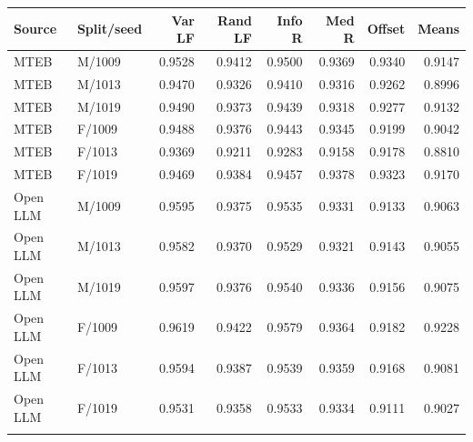 \begin{tabular}{llrrrrrr}\toprule Source & Split/seed & Var LF & Rand LF & Info R & Med R & Offset & Means \\ \midrule
MTEB & M/1009 & 0.9528 & 0.9412 & 0.9500 & 0.9369 & 0.9340 & 0.9147 \\
MTEB & M/1013 & 0.9470 & 0.9326 & 0.9410 & 0.9316 & 0.9262 & 0.8996 \\
MTEB & M/1019 & 0.9490 & 0.9373 & 0.9439 & 0.9318 & 0.9277 & 0.9132 \\
\addlinespace
MTEB & F/1009 & 0.9488 & 0.9376 & 0.9443 & 0.9345 & 0.9199 & 0.9042 \\
MTEB & F/1013 & 0.9369 & 0.9211 & 0.9283 & 0.9158 & 0.9178 & 0.8810 \\
MTEB & F/1019 & 0.9469 & 0.9384 & 0.9457 & 0.9378 & 0.9323 & 0.9170 \\
\addlinespace
Open LLM & M/1009 & 0.9595 & 0.9375 & 0.9535 & 0.9331 & 0.9133 & 0.9063 \\
Open LLM & M/1013 & 0.9582 & 0.9370 & 0.9529 & 0.9321 & 0.9143 & 0.9055 \\
Open LLM & M/1019 & 0.9597 & 0.9376 & 0.9540 & 0.9336 & 0.9156 & 0.9075 \\
\addlinespace
Open LLM & F/1009 & 0.9619 & 0.9422 & 0.9579 & 0.9364 & 0.9182 & 0.9228 \\
Open LLM & F/1013 & 0.9594 & 0.9387 & 0.9539 & 0.9359 & 0.9168 & 0.9081 \\
Open LLM & F/1019 & 0.9531 & 0.9358 & 0.9533 & 0.9334 & 0.9111 & 0.9027 \\
\addlinespace
\bottomrule\end{tabular}